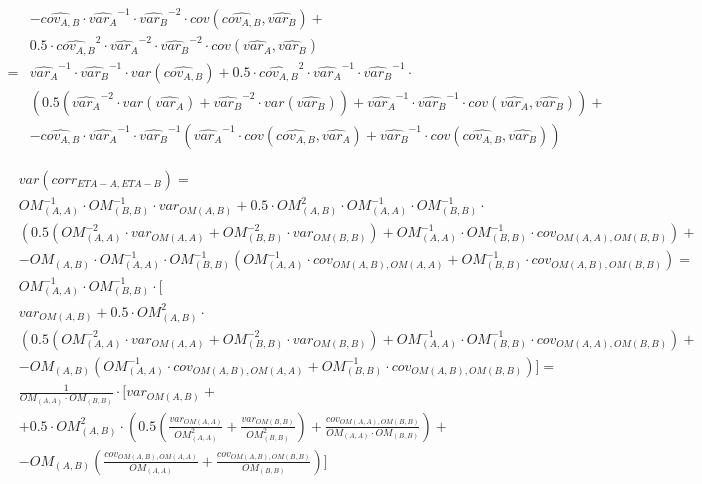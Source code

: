 \[\begin{split}
& - \hat{cov_{A,B}} \cdot \hat{var_{A}}^{-1} \cdot \hat{var_{B}}^{-2} \cdot cov\left(\hat{cov_{A,B}},\hat{var_{B}}\right)+\\
& 0.5 \cdot \hat{cov_{A,B}}^2\cdot \hat{var_{A}}^{-2} \cdot \hat{var_{B}}^{-2}\cdot cov\left(\hat{var_{A}},\hat{var_{B}}\right)\\
=&\hat{var_{A}}^{-1} \cdot \hat{var_{B}}^{-1}\cdot var\left(\hat{cov_{A,B}} \right)+0.5 \cdot \hat{cov_{A,B}}^2\cdot \hat{var_{A}}^{-1} \cdot \hat{var_{B}}^{-1}\cdot \\
&\left(0.5 \left ( \hat{var_{A}}^{-2}\cdot var\left(\hat{var_{A}} \right)+\hat{var_{B}}^{-2}\cdot var\left(\hat{var_{B}} \right)    \right) +  \hat{var_{A}}^{-1} \cdot \hat{var_{B}}^{-1}\cdot cov\left(\hat{var_{A}},\hat{var_{B}}\right) \right)+\\
& - \hat{cov_{A,B}} \cdot \hat{var_{A}}^{-1} \cdot \hat{var_{B}}^{-1}\left(\hat{var_{A}}^{-1} \cdot cov\left(\hat{cov_{A,B}},\hat{var_{A}}\right)+\hat{var_{B}}^{-1}\cdot cov\left(\hat{cov_{A,B}},\hat{var_{B}}\right) \right)
\end{split}
\]

\[
\begin{split}
&var\left(corr_{ETA-A,ETA-B}\right)=\\
& OM_{(A,A)}^{-1} \cdot OM_{(B,B)}^{-1}\cdot var_{OM(A,B)}+0.5 \cdot OM_{(A,B)}^2\cdot OM_{(A,A)}^{-1} \cdot OM_{(B,B)}^{-1}\cdot \\
&\left(0.5 \left ( OM_{(A,A)}^{-2}\cdot var_{OM(A,A)}+OM_{(B,B)}^{-2}\cdot var_{OM(B,B)}    \right) +  OM_{(A,A)}^{-1} \cdot OM_{(B,B)}^{-1}\cdot cov_{OM(A,A),OM(B,B)} \right)+\\
& - OM_{(A,B)} \cdot OM_{(A,A)}^{-1} \cdot OM_{(B,B)}^{-1}\left(OM_{(A,A)}^{-1} \cdot cov_{OM(A,B),OM(A,A)}+OM_{(B,B)}^{-1}\cdot cov_{OM(A,B),OM(B,B)} \right) =\\
& OM_{(A,A)}^{-1} \cdot OM_{(B,B)}^{-1}\cdot [ \\
& var_{OM(A,B)}+0.5 \cdot OM_{(A,B)}^2\cdot \\
&\left(0.5 \left ( OM_{(A,A)}^{-2}\cdot var_{OM(A,A)}+OM_{(B,B)}^{-2}\cdot var_{OM(B,B)}    \right) +  OM_{(A,A)}^{-1} \cdot OM_{(B,B)}^{-1}\cdot cov_{OM(A,A),OM(B,B)} \right)+\\
& - OM_{(A,B)} \left(OM_{(A,A)}^{-1} \cdot cov_{OM(A,B),OM(A,A)}+OM_{(B,B)}^{-1}\cdot cov_{OM(A,B),OM(B,B)} \right) ]=\\
& \frac{1}{OM_{(A,A)}\cdot OM_{(B,B)}}\cdot [ var_{OM(A,B)} +\\
& +0.5 \cdot OM_{(A,B)}^2\cdot
\left(0.5 \left ( \frac{var_{OM(A,A)}}{OM_{(A,A)}^{2}}  +\frac{var_{OM(B,B)}}{OM_{(B,B)}^{2}}    \right) +  \frac{cov_{OM(A,A),OM(B,B)}}{OM_{(A,A)} \cdot OM_{(B,B)}} \right)+\\
& - OM_{(A,B)} \left(\frac{cov_{OM(A,B),OM(A,A)}}{OM_{(A,A)}}+ \frac{cov_{OM(A,B),OM(B,B)}}{OM_{(B,B)}} \right) ]\\
\end{split}
\]

